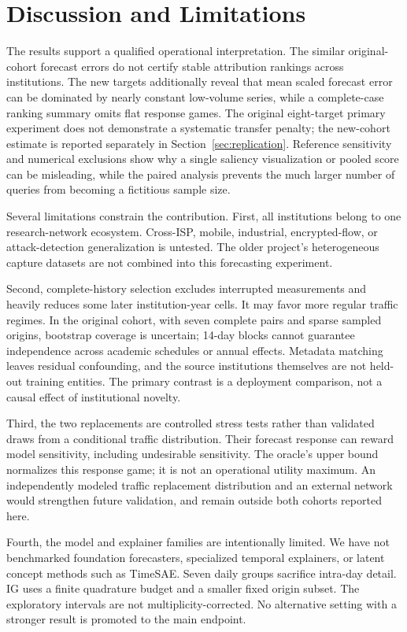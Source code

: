 \documentclass[conference]{IEEEtran}
\begin{document}


\section{Discussion and Limitations}
The results support a qualified operational interpretation. The similar original-cohort forecast errors do not certify stable attribution rankings across institutions. The new targets additionally reveal that mean scaled forecast error can be dominated by nearly constant low-volume series, while a complete-case ranking summary omits flat response games. The original eight-target primary experiment does not demonstrate a systematic transfer penalty; the new-cohort estimate is reported separately in Section~\ref{sec:replication}. Reference sensitivity and numerical exclusions show why a single saliency visualization or pooled score can be misleading, while the paired analysis prevents the much larger number of queries from becoming a fictitious sample size.

Several limitations constrain the contribution. First, all institutions belong to one research-network ecosystem. Cross-ISP, mobile, industrial, encrypted-flow, or attack-detection generalization is untested. The older project's heterogeneous capture datasets are not combined into this forecasting experiment.

Second, complete-history selection excludes interrupted measurements and heavily reduces some later institution-year cells. It may favor more regular traffic regimes. In the original cohort, with seven complete pairs and sparse sampled origins, bootstrap coverage is uncertain; 14-day blocks cannot guarantee independence across academic schedules or annual effects. Metadata matching leaves residual confounding, and the source institutions themselves are not held-out training entities. The primary contrast is a deployment comparison, not a causal effect of institutional novelty.

Third, the two replacements are controlled stress tests rather than validated draws from a conditional traffic distribution. Their forecast response can reward model sensitivity, including undesirable sensitivity. The oracle's upper bound normalizes this response game; it is not an operational utility maximum. An independently modeled traffic replacement distribution and an external network would strengthen future validation, and remain outside both cohorts reported here.

Fourth, the model and explainer families are intentionally limited. We have not benchmarked foundation forecasters, specialized temporal explainers, or latent concept methods such as TimeSAE. Seven daily groups sacrifice intra-day detail. IG uses a finite quadrature budget and a smaller fixed origin subset. The exploratory intervals are not multiplicity-corrected. No alternative setting with a stronger result is promoted to the main endpoint.
\end{document}

